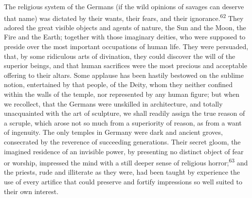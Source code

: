 




The religious system of the Germans (if the wild opinions of
savages can deserve that name) was dictated by their wants, their
fears, and their ignorance.\textsuperscript{62} They adored the great visible
objects and agents of nature, the Sun and the Moon, the Fire and
the Earth; together with those imaginary deities, who were
supposed to preside over the most important occupations of human
life. They were persuaded, that, by some ridiculous arts of
divination, they could discover the will of the superior beings,
and that human sacrifices were the most precious and acceptable
offering to their altars. Some applause has been hastily bestowed
on the sublime notion, entertained by that people, of the Deity,
whom they neither confined within the walls of the temple, nor
represented by any human figure; but when we recollect, that the
Germans were unskilled in architecture, and totally unacquainted
with the art of sculpture, we shall readily assign the true
reason of a scruple, which arose not so much from a superiority
of reason, as from a want of ingenuity. The only temples in
Germany were dark and ancient groves, consecrated by the
reverence of succeeding generations. Their secret gloom, the
imagined residence of an invisible power, by presenting no
distinct object of fear or worship, impressed the mind with a
still deeper sense of religious horror;\textsuperscript{63} and the priests, rude
and illiterate as they were, had been taught by experience the
use of every artifice that could preserve and fortify impressions
so well suited to their own interest.


